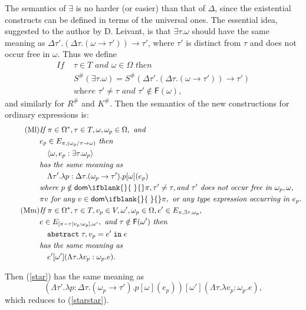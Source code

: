 \documentclass[sigplan,screen,nonacm,balance=false]{acmart}
\theoremstyle{plain}
\DeclarePairedDelimiter{\pair}{\langle}{\rangle}
\newcommand{\abstractin}[4]{\mathtt{abstract} \; #1, #2 = #3 \; \mathtt{in} \; #4}
\newcommand{\dom}[1]{\mathsf{dom}\ifblank{#1}{\;}{#1}}
\newcommand{\FV}{\mathsf{F}}
\begin{document}
The semantics of $\exists$ is no harder (or easier) than that of $\Delta$, since the existential constructs can be defined in terms of the universal ones.
The essential idea, suggested to the author by D. Leivant, is that $\exists \tau. \omega$ should have the same meaning as $\Delta \tau'. (\Delta \tau. (\omega \to \tau')) \to \tau'$, where $\tau'$ is distinct from $\tau$ and does not occur free in $\omega$.
Thus we define
%
\begin{align*}\tag{S6}
  \textit{If } & \tau \in T \textit{ and } \omega \in \Omega \textit{ then } \\
  & S^\#(\exists \tau. \omega) = S^\#(\Delta \tau'. (\Delta \tau. (\omega \to \tau')) \to \tau') \\
  & \textit{where } \tau' \neq \tau \textit{ and } \tau' \notin \FV(\omega),
\end{align*}
%
and similarly for $R^\#$ and $K^\#$. Then the semantics of the new constructions for ordinary expressions is:
%
\begin{align*}
  \tag{Ml}
  & \textit{If } \pi \in \Omega^*, \tau \in T, \omega, \omega_p \in \Omega, \textit{ and } \\
  & e_p \in E_{\pi, (\omega_p/\tau \to \omega)} \textit{ then } \\
  & \quad \pair{\omega, e_p : \exists \tau. \omega_p} \\
  & \textit{has the same meaning as } \\
  & \quad \Lambda \tau'. \lambda p: \Delta \tau. (\omega_p \to \tau'). p [\omega](e_p) \\
  & \textit{where } p \notin \dom{} \pi, \tau' \neq \tau, \textit{and } \tau' \textit{ does not occur free in } \omega_p, \omega, \\
  & \pi v \textit{ for any } v \in \dom{} \pi, \textit{ or any type expression occurring in } e_p. \\[\parskip]
  \tag{Mm}
  & \textit{If } \pi \in \Omega^*, \tau \in T, v_p \in V, \omega', \omega_p \in \Omega, e' \in E_{\pi, \exists \tau. \omega_p}, \\
  & e \in E_{[\pi - \tau \mid v_p: \omega_p], \omega'}, \textit{ and } \tau \notin \FV(\omega') \textit{ then } \\
  & \quad \abstractin{\tau}{v_p}{e'}{e} \\
  & \textit{has the same meaning as } \\
  & \quad e'[\omega'](\Lambda \tau. \lambda v_p: \omega_p. e).
\end{align*}

Then (\ref{star}) has the same meaning as
%
\begin{equation*}
  (\Lambda \tau'. \lambda p: \Delta \tau. (\omega_p \to \tau'). p[\omega](e_p))[\omega'](\Lambda \tau. \lambda v_p: \omega_p. e),
\end{equation*}
%
which reduces to (\ref{starstar}).
\end{document}
